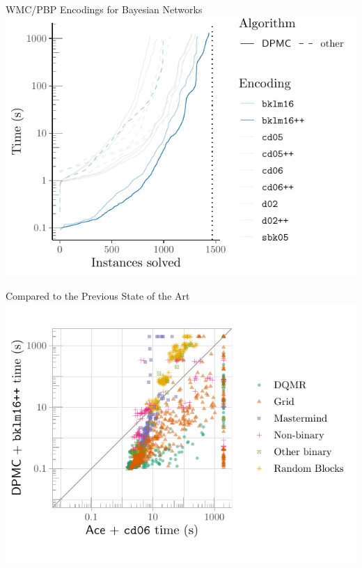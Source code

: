 \documentclass{beamer}
\begin{document}
\begin{frame}{WMC/PBP Encodings for Bayesian Networks}
  \centering
  \includegraphics[width=\textwidth]{cumulative5}
\end{frame}

\begin{frame}{Compared to the Previous State of the Art}
  \centering
  \includegraphics[width=\textwidth]{scatter1}
\end{frame}
\end{document}
